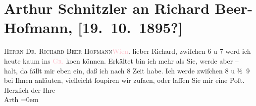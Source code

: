 

               \section[Arthur Schnitzler an Richard Beer-Hofmann, {[}19. 10. 1895?{]}]{ Arthur Schnitzler an Richard Beer-Hofmann, {[}19. 10. 1895?{]}}\nopagebreak{}\rehead{ }\normalsize\beginnumbering{} \toendnotes[C]{\smallbreak\pagebreak[2]} 
\pstart{}{\pb}\textsc{Herrn Dr. Richard
                     Beer-Hofmann}\pend{}\pstart{}\textcolor{pink}{Wien}{}\ledrightnote{\textcolor{pink}{Wien}}.\pend{}{\bigskip}\pstart
           \noindent{}{\pb}lieber Richard, zwiſchen
                  6 u 7 werd ich heute kaum ins \textsc{\textcolor{pink}{Gr.}{}\ledrightnote{\textcolor{pink}{Café Griensteidl}}} ko{\geminationm}en
               können. Erkältet bin ich mehr als Sie, werde aber – halt, da fällt mir eben ein, daß
               ich nach 8 Zeit habe. Ich werde zwiſchen 8 u
                  ½ 9 bei {\pb}Ihnen anläuten,
               vielleicht ſoupiren wir zuſa{\geminationm}en, oder laſſen Sie mir
               eine Poſt.\pend
           \pstart
           Herzlich der Ihre{\\[\baselineskip]}\spacefill\mbox{Arth}\pend
           \leftskip=0em{}\endnumbering{}  
      
